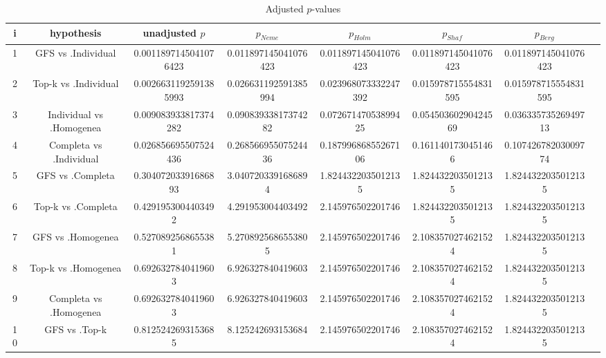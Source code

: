 \documentclass[a4paper,10pt]{article}
\begin{document}
\begin{landscape}
\begin{table}[!htp]
\centering\tiny
\caption{Adjusted $p$-values}
\begin{tabular}{cccccccc}
i&hypothesis&unadjusted $p$&$p_{Neme}$&$p_{Holm}$&$p_{Shaf}$&$p_{Berg}$\\
\hline
1&GFS vs .Individual&0.0011897145041076423&0.011897145041076423&0.011897145041076423&0.011897145041076423&0.011897145041076423\\
2&Top-k vs .Individual&0.0026631192591385993&0.026631192591385994&0.023968073332247392&0.015978715554831595&0.015978715554831595\\
3&Individual vs .Homogenea&0.009083933817374282&0.09083933817374282&0.07267147053899425&0.05450360290424569&0.03633573526949713\\
4&Completa vs .Individual&0.026856695507524436&0.26856695507524436&0.18799686855267106&0.1611401730451466&0.10742678203009774\\
5&GFS vs .Completa&0.30407203391686893&3.0407203391686894&1.8244322035012135&1.8244322035012135&1.8244322035012135\\
6&Top-k vs .Completa&0.4291953004403492&4.291953004403492&2.145976502201746&1.8244322035012135&1.8244322035012135\\
7&GFS vs .Homogenea&0.5270892568655381&5.2708925686553805&2.145976502201746&2.1083570274621524&1.8244322035012135\\
8&Top-k vs .Homogenea&0.6926327840419603&6.926327840419603&2.145976502201746&2.1083570274621524&1.8244322035012135\\
9&Completa vs .Homogenea&0.6926327840419603&6.926327840419603&2.145976502201746&2.1083570274621524&1.8244322035012135\\
10&GFS vs .Top-k&0.8125242693153685&8.125242693153684&2.145976502201746&2.1083570274621524&1.8244322035012135\\
\hline
\end{tabular}
\end{table}

\end{landscape}
\end{document}
